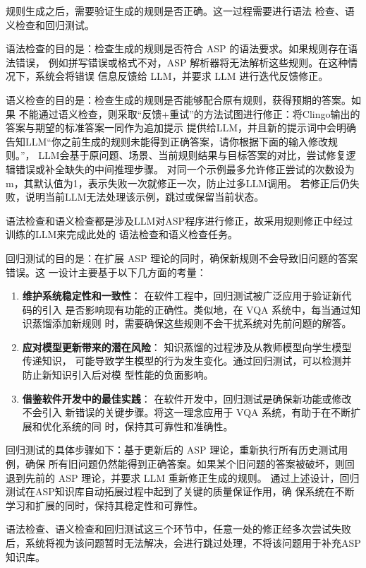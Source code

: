 规则生成之后，需要验证生成的规则是否正确。这一过程需要进行语法
检查、语义检查和回归测试。

语法检查的目的是：检查生成的规则是否符合 ASP 的语法要求。如果规则存在语法错误，
例如拼写错误或格式不对，ASP 解析器将无法解析这些规则。在这种情况下，系统会将错误
信息反馈给 LLM，并要求 LLM 进行迭代反馈修正。

语义检查的目的是：检查生成的规则是否能够配合原有规则，获得预期的答案。如果
不能通过语义检查，则采取“反馈+重试”的方法试图进行修正：将Clingo输出的答案与期望的标准答案一同作为追加提示
提供给LLM，并且新的提示词中会明确告知LLM“你之前生成的规则未能得到正确答案，请你根据下面的输入修改规则。”，
LLM会基于原问题、场景、当前规则结果与目标答案的对比，尝试修复逻辑错误或补全缺失的中间推理步骤。
对同一个示例最多允许修正尝试的次数设为m，其默认值为1，表示失败一次就修正一次，防止过多LLM调用。
若修正后仍失败，说明当前LLM无法处理该示例，跳过或保留当前状态。

语法检查和语义检查都是涉及LLM对ASP程序进行修正，故采用规则修正中经过训练的LLM来完成此处的
语法检查和语义检查任务。

回归测试的目的是：在扩展 ASP 理论的同时，确保新规则不会导致旧问题的答案错误。这
一设计主要基于以下几方面的考量：
\begin{enumerate}[nosep]
\item \textbf{维护系统稳定性和一致性}： 在软件工程中，回归测试被广泛应用于验证新代码的引入
是否影响现有功能的正确性。类似地，在 VQA 系统中，每当通过知识蒸馏添加新规则
时，需要确保这些规则不会干扰系统对先前问题的解答。
\item \textbf{应对模型更新带来的潜在风险}： 知识蒸馏的过程涉及从教师模型向学生模型传递知识，
可能导致学生模型的行为发生变化。通过回归测试，可以检测并防止新知识引入后对模
型性能的负面影响。
\item \textbf{借鉴软件开发中的最佳实践}： 在软件开发中，回归测试是确保新功能或修改不会引入
新错误的关键步骤。将这一理念应用于 VQA 系统，有助于在不断扩展和优化系统的同
时，保持其可靠性和准确性。
\end{enumerate}

回归测试的具体步骤如下：基于更新后的 ASP 理论，重新执行所有历史测试用例，确保
所有旧问题仍然能得到正确答案。如果某个旧问题的答案被破坏，则回退到先前的 ASP 理论，并要求 LLM 重新修正生成的规则。
通过上述设计，回归测试在ASP知识库自动拓展过程中起到了关键的质量保证作用，确
保系统在不断学习和扩展的同时，保持其稳定性和可靠性。

语法检查、语义检查和回归测试这三个环节中，任意一处的修正经多次尝试失败后，系统将视为该问题暂时无法解决，会进行跳过处理，不将该问题用于补充ASP知识库。

